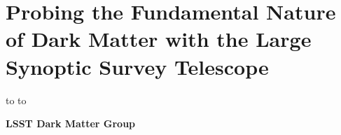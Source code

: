 \documentclass[titlepage,oneside]{tcibook}
\begin{document}
\raggedbottom


\parindent=0pt
\parskip=8pt
\setlength{\evensidemargin}{0pt}
\setlength{\oddsidemargin}{0pt}
\setlength{\marginparsep}{0.0in}
\setlength{\marginparwidth}{0.0in}
\marginparpush=0pt


\renewcommand{\chapname}{chap:intro_}
\renewcommand{\chapterdir}{.}
\renewcommand{\arraystretch}{1.25}
\addtolength{\arraycolsep}{-3pt}
\renewcommand{\paragraph}[1]{\emph{#1}\xspace}

\chapter*{Probing the Fundamental Nature of Dark Matter with the Large Synoptic Survey Telescope}
\vskip -9.5pt
\hbox to
\vskip-6.5pt
\hbox to


\begin{center}
  {\Large\bf
    LSST Dark Matter Group\\
    \bigskip
    \date{}
  }
\end{center}
\eject

\setcounter{page}{1}



\clearpage


\tableofcontents 

\eject
{} 
\setcounter{page}{1}






\end{document}
